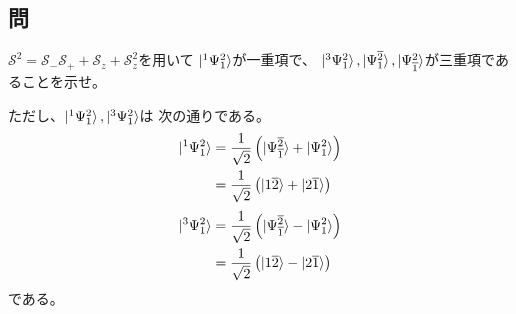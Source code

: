 \subsection{問}
$\mathscr{S}^2=\mathscr{S}_-\mathscr{S}_+ +\mathscr{S}_z +\mathscr{S}_z^2$を用いて
$\ket{^1\Psi_1^2}$が一重項で、
$\ket{^3\Psi_1^2},\ket{\Psi_{{1}}^{{\overline{2}}}},\ket{\Psi_{{\overline{1}}}^{{2}}}$が三重項であることを示せ。

ただし、$\ket{^1\Psi_1^2},\ket{^3\Psi_1^2}$は
次の通りである。
\begin{align}
	\ket{^1\Psi_1^2}
&=
	\frac{1}{\sqrt{2}}
	\left(
		\ket{\Psi_{\borb{1}}^{\borb{2}}}
		+
		\ket{\Psi_{\aorb{1}}^{\aorb{2}}}
	\right) \\
%
%
&=
	\frac{1}{\sqrt{2}}
	\left(
		\ket{\aorb{1}\borb{2}}
		+
		\ket{\aorb{2}\borb{1}}
	\right)
\end{align}
\begin{align}
	\ket{^3\Psi_1^2}
&=
	\frac{1}{\sqrt{2}}
	\left(
		\ket{\Psi_{\borb{1}}^{\borb{2}}}
		-
		\ket{\Psi_{\aorb{1}}^{\aorb{2}}}
	\right) \\
%
%
&=
	\frac{1}{\sqrt{2}}
	\left(
		\ket{\aorb{1}\borb{2}}
		-
		\ket{\aorb{2}\borb{1}}
	\right)
\end{align}
である。

